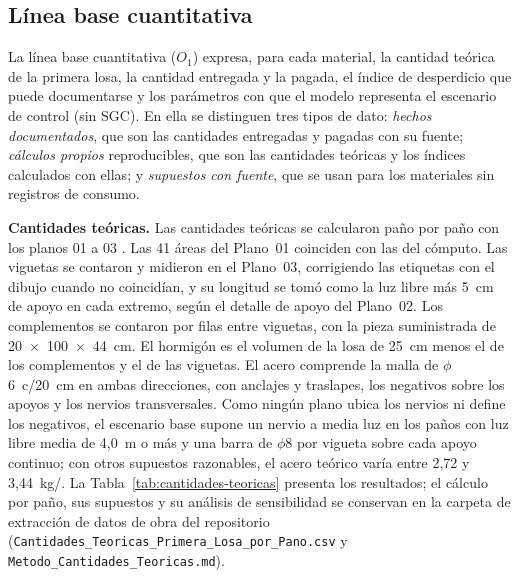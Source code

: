\subsection{Línea base cuantitativa}
\label{sec:linea-base-cuantitativa}

La línea base cuantitativa ($O_1$) expresa, para cada material, la cantidad teórica de la primera losa, la cantidad entregada y la pagada, el índice de desperdicio que puede documentarse y los parámetros con que el modelo representa el escenario de control (sin SGC). En ella se distinguen tres tipos de dato: \emph{hechos documentados}, que son las cantidades entregadas y pagadas con su fuente; \emph{cálculos propios} reproducibles, que son las cantidades teóricas y los índices calculados con ellas; y \emph{supuestos con fuente}, que se usan para los materiales sin registros de consumo.

\textbf{Cantidades teóricas.} Las cantidades teóricas se calcularon paño por paño con los planos 01 a 03 \parencite{uatf_planos}. Las 41 áreas del Plano~01 coinciden con las del cómputo. Las viguetas se contaron y midieron en el Plano~03, corrigiendo las etiquetas con el dibujo cuando no coincidían, y su longitud se tomó como la luz libre más 5~cm de apoyo en cada extremo, según el detalle de apoyo del Plano~02. Los complementos se contaron por filas entre viguetas, con la pieza suministrada de 20~$\times$~100~$\times$~44~cm. El hormigón es el volumen de la losa de 25~cm menos el de los complementos y el de las viguetas. El acero comprende la malla de $\phi$6~c/20~cm en ambas direcciones, con anclajes y traslapes, los negativos sobre los apoyos y los nervios transversales. Como ningún plano ubica los nervios ni define los negativos, el escenario base supone un nervio a media luz en los paños con luz libre media de 4,0~m o más y una barra de $\phi$8 por vigueta sobre cada apoyo continuo; con otros supuestos razonables, el acero teórico varía entre 2,72 y 3,44~kg/\mdos{}. La Tabla~\ref{tab:cantidades-teoricas} presenta los resultados; el cálculo por paño, sus supuestos y su análisis de sensibilidad se conservan en la carpeta de extracción de datos de obra del repositorio (\texttt{Cantidades\_Teoricas\_Primera\_Losa\_por\_Pano.csv} y \texttt{Metodo\_Cantidades\_Teoricas.md}).

